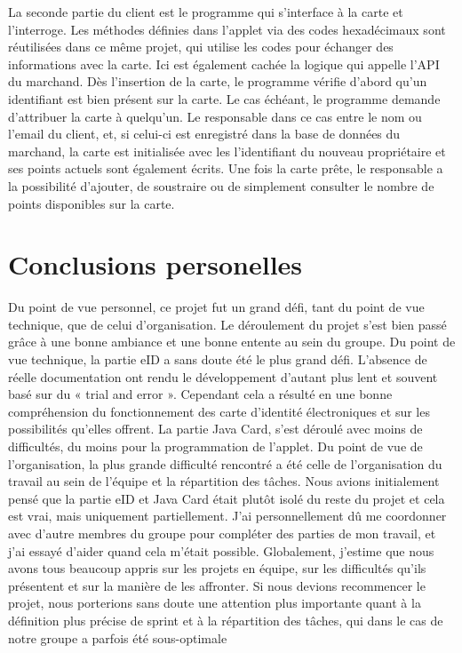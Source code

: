 La seconde partie du client est le programme qui s'interface à la carte et l'interroge. Les méthodes
définies dans l'applet via des codes hexadécimaux sont réutilisées dans ce même projet, qui utilise les
codes pour échanger des informations avec la carte. Ici est également cachée la logique qui appelle
l'API du marchand.
Dès l'insertion de la carte, le programme vérifie d'abord qu'un identifiant est bien présent sur la carte.
Le cas échéant, le programme demande d'attribuer la carte à quelqu'un. Le responsable dans ce cas
entre le nom ou l'email du client, et, si celui-ci est enregistré dans la base de données du marchand, la
carte est initialisée avec les l'identifiant du nouveau propriétaire et ses points actuels sont également
écrits. Une fois la carte prête, le responsable a la possibilité d'ajouter, de soustraire ou de simplement
consulter le nombre de points disponibles sur la carte.

\section{Conclusions personelles}

Du point de vue personnel, ce projet fut un grand défi, tant du point de vue technique, que de celui
d'organisation. Le déroulement du projet s'est bien passé grâce à une bonne ambiance et une bonne
entente au sein du groupe.
Du point de vue technique, la partie eID a sans doute été le plus grand défi. L'absence de réelle
documentation ont rendu le développement d'autant plus lent et souvent basé sur du « trial and
error ». Cependant cela a résulté en une bonne compréhension du fonctionnement des carte
d'identité électroniques et sur les possibilités qu'elles offrent. La partie Java Card, s'est déroulé avec
moins de difficultés, du moins pour la programmation de l'applet.
Du point de vue de l'organisation, la plus grande difficulté rencontré a été celle de l'organisation du
travail au sein de l'équipe et la répartition des tâches. Nous avions initialement pensé que la partie eID
et Java Card était plutôt isolé du reste du projet et cela est vrai, mais uniquement partiellement. J'ai
personnellement dû me coordonner avec d'autre membres du groupe pour compléter des parties de
mon travail, et j'ai essayé d'aider quand cela m'était possible.
Globalement, j'estime que nous avons tous beaucoup appris sur les projets en équipe, sur les difficultés
qu'ils présentent et sur la manière de les affronter. Si nous devions recommencer le projet, nous
porterions sans doute une attention plus importante quant à la définition plus précise de sprint et à la
répartition des tâches, qui dans le cas de notre groupe a parfois été sous-optimale
